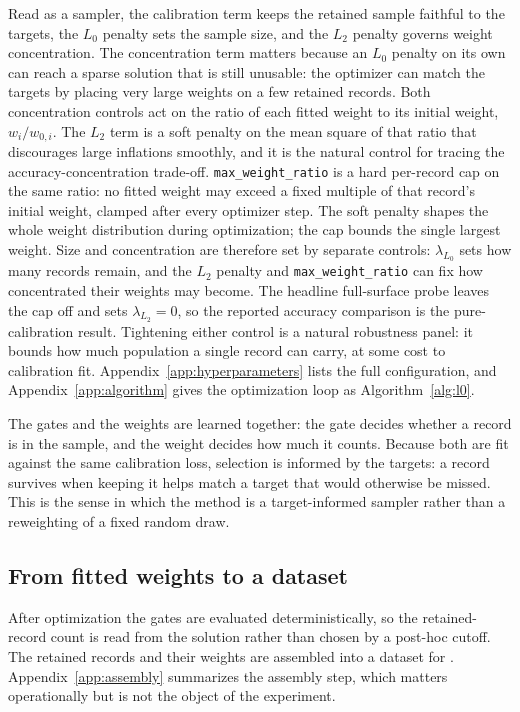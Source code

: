 Read as a sampler, the calibration term keeps the retained sample faithful to the targets, the $L_0$
penalty sets the sample size, and the $L_2$ penalty governs weight concentration. The concentration
term matters because an $L_0$ penalty on its own can reach a sparse solution that is still unusable: the
optimizer can match the targets by placing very large weights on a few retained records. Both
concentration controls act on the ratio of each fitted weight to its initial weight, $w_i / w_{0,i}$.
The $L_2$ term is a soft penalty on the mean square of that ratio that discourages large inflations
smoothly, and it is the natural control for tracing the accuracy-concentration trade-off.
\texttt{max\_weight\_ratio} is a hard per-record cap on the same ratio: no fitted weight may exceed a
fixed multiple of that record's initial weight, clamped after every optimizer step. The soft penalty
shapes the whole weight distribution during optimization; the cap bounds the single largest weight.
Size and concentration are therefore set by separate controls: $\lambda_{L_0}$ sets how many records
remain, and the $L_2$ penalty and \texttt{max\_weight\_ratio} can fix how concentrated their weights may
become. The headline full-surface probe leaves the cap off and sets $\lambda_{L_2}=0$, so the reported
accuracy comparison is the pure-calibration result. Tightening either control is a natural robustness panel:
it bounds how much population a single record can carry, at some cost to calibration fit. Appendix~\ref{app:hyperparameters} lists the
full configuration, and Appendix~\ref{app:algorithm} gives the optimization loop as
Algorithm~\ref{alg:l0}.

The gates and the weights are learned together: the gate decides whether a record is in the sample,
and the weight decides how much it counts. Because both are fit against the same calibration loss,
selection is informed by the targets: a record survives when keeping it helps match a target that
would otherwise be missed. This is the sense in which the method is a target-informed sampler rather
than a reweighting of a fixed random draw.

\subsection{From fitted weights to a dataset}

After optimization the gates are evaluated deterministically, so the retained-record count is read
from the solution rather than chosen by a post-hoc cutoff. The retained records and their weights are
assembled into a dataset for \policyengine{}. Appendix~\ref{app:assembly} summarizes the assembly
step, which matters operationally but is not the object of the experiment.

